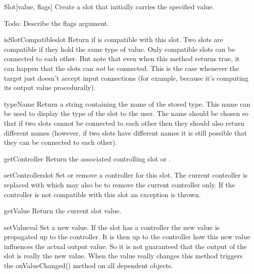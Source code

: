 \begin{classdesc}{Slot}{[value, flags]}
  Create a slot that initially carries the specified value.

  Todo: Describe the flags argument.
\end{classdesc}


\begin{methoddesc}{isSlotCompatible}{slot}
Return  if  is compatible with this slot. Two slots are
compatible if they hold the same type of value. Only compatible slots can be
connected to each other. But note that even when this method returns
true, it can happen that the slots can {\it not} be connected. This is the
case whenever the target just doesn't accept input connections (for
example, because it's computing its output value procedurally).
\end{methoddesc}

\begin{methoddesc}{typeName}{}
Return a string containing the name of the stored type. This name can
be used to display the type of the slot to the user. The name should
be chosen so that if two slots cannot be connected to each other then
they should also return different names (however, if two slots have
different names it is still possible that they can be connected to each
other).
\end{methoddesc}

\begin{methoddesc}{getController}{}
Return the associated controlling slot or .
\end{methoddesc}

\begin{methoddesc}{setController}{slot}
Set or remove a controller for this slot.  The current controller is
replaced with  which may also be  to remove the
current controller only. If the controller is not compatible with this
slot an  exception is thrown. 
\end{methoddesc}

\begin{methoddesc}{getValue}{}
Return the current slot value.
\end{methoddesc}

\begin{methoddesc}{setValue}{val}
Set a new value. If the slot has a controller the new value is
propagated up to the controller. It is then up to the controller how
this new value influences the actual output value. So it is not
guaranteed that the output of the slot is really the new value. When
the value really changes this method triggers the onValueChanged() method
on all dependent objects.
\end{methoddesc}

